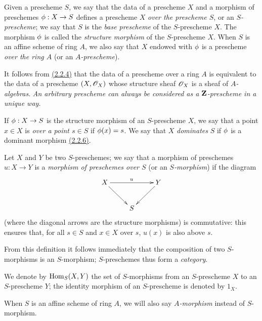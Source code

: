 \begin{defn}[2.5.1]
\label{defn-1.2.5.1}
Given a prescheme $S$, we say that the data of a
prescheme $X$ and a morphism of preschemes $\phi:X\to S$ defines a
prescheme $X$ {\it over the prescheme $S$}, or an {\it $S$-prescheme}; we say
that $S$ is the {\it base prescheme} of the $S$-prescheme $X$. The morphism
$\phi$ is called the {\it structure morphism} of the $S$-prescheme $X$.
When $S$ is an affine scheme of ring $A$, we also say that $X$ endowed with
$\phi$ is a prescheme {\it over the ring $A$} (or an {\it $A$-prescheme}).
\end{defn}

It follows from \hyperref[prop-1.2.2.4]{(2.2.4)} that the data of a prescheme over a ring $A$ is
equivalent to the data of a prescheme $(X,\mathscr{O}_X)$ whose structure sheaf $\mathscr{O}_X$ is
a sheaf of {\it $A$-algebras}. {\it An arbitrary prescheme can always be
considered as a $\mathbf{Z}$-prescheme in a unique way.}

If $\phi:X\to S$ is the structure morphism of an $S$-prescheme $X$, we
say that a point $x\in X$ is {\it over a point $s\in S$} if $\phi(x)=s$. We
say that $X$ {\it dominates} $S$ if $\phi$ is a dominant morphism \hyperref[env-1.2.2.6]{(2.2.6)}.

\begin{env}[2.5.2]
\label{env-1.2.5.2}
Let $X$ and $Y$ be two $S$-preschemes; we say that a morphism
of preschemes $u:X\to Y$ is a {\it morphism of preschemes over $S$} (or
an {\it $S$-morphism}) if the diagram
\[
  \xymatrix{
    X \ar[rr]^u \ar[dr] & & Y\ar[dl]\\
    & S &
  }
\]
(where the diagonal arrows are the structure morphisms) is
commutative: this ensures that, for all $s\in S$ and $x\in X$ over $s$, $u(x)$
is also above $s$.
\end{env}

From this definition it follows immediately that the composition of two
$S$-morphisms is an $S$-morphism; $S$-preschemes thus form a {\it category}.

We denote by ${\mathop{\mathrm{Hom}}\nolimits}_S(X,Y)$ the set of $S$-morphisms from an $S$-prescheme $X$ to
an $S$-prescheme $Y$; the identity morphism of an $S$-prescheme is denoted by
$1_X$.

When $S$ is an affine scheme of ring $A$, we will also say {\it $A$-morphism}
instead of $S$-morphism.

